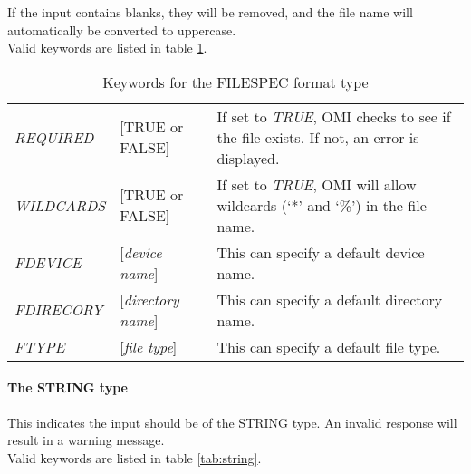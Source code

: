 \documentclass[a4paper]{book}
\begin{document}
If the input contains blanks, they will be removed, and the file name will 
automatically be converted to uppercase. \\
Valid keywords are listed in table \ref{tab:filespec}.

\begin{table}[h!tb]
\begin{minipage}[h!tb]{\textwidth}
\begin{tabular}{llp{6cm}} \hline
\textsl{REQUIRED} & [\textsf{TRUE} or \textsf{FALSE}] & If set to \textsl{TRUE}, OMI checks to see if the file exists. If not, an error is displayed.\\
\textsl{WILDCARDS} & [\textsf{TRUE} or \textsf{FALSE}] & If set to \textsl{TRUE}, OMI will allow wildcards (`*' and `\%') in the file name.\\
\textsl{FDEVICE} & [\textit{device name}] & This can specify a default device name. \\
\textsl{FDIRECORY} & [\textit{directory name}] & This can specify a default directory name. \\
\textsl{FTYPE} & [\textit{file type}] & This can specify a default file type. \\ \hline
\end{tabular}
\caption{Keywords for the FILESPEC format type}\label{tab:filespec}
\end{minipage}
\end{table}

\paragraph{The STRING type}

This indicates the input should be of the \textsf{STRING} 
type. An invalid response will 
result in a warning message. \\
Valid keywords are listed in table \ref{tab:string}.
\end{document}
